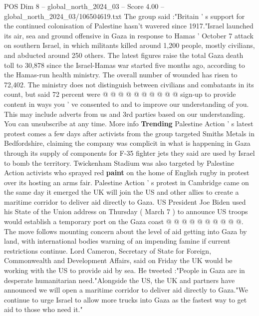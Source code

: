 \begin{textsample}{POS Dim 8 – global\_north\_2024\_03 – Score 4.00 – global\_north\_2024\_03/106504619.txt}
The group said :"Britain ' s support for the continued colonisation of Palestine hasn't wavered since 1917."Israel launched its air, sea and ground offensive in Gaza in response to Hamas ' October 7 attack on southern Israel, in which militants killed around 1,200 people, mostly civilians, and abducted around 250 others.
The latest figures raise the total Gaza death toll to 30,878 since the Israel-Hamas war started five months ago, according to the Hamas-run health ministry.
The overall number of wounded has risen to 72,402.
The ministry does not distinguish between civilians and combatants in its count, but said 72 percent were @ @ @ @ @ @ @ @ @ @ sign-up to provide content in ways you ' ve consented to and to improve our understanding of you.
This may include adverts from us and 3rd parties based on our understanding.
You can unsubscribe at any time.
More info \textbf{Trending} Palestine Action ' s latest protest comes a few days after activists from the group targeted Smiths Metals in Bedfordshire, claiming the company was complicit in what is happening in Gaza through its supply of components for F-35 fighter jets they said are used by Israel to bomb the territory.
Twickenham Stadium was also targeted by Palestine Action activists who sprayed red \textbf{paint} on the home of English rugby in protest over its hosting an arms fair.
Palestine Action ' s protest in Cambridge came on the same day it emerged the UK will join the US and other allies to create a maritime corridor to deliver aid directly to Gaza.
US President Joe Biden used his State of the Union address on Thursday ( March 7 ) to announce US troops would establish a temporary port on the Gaza coast @ @ @ @ @ @ @ @ @ @.
The move follows mounting concern about the level of aid getting into Gaza by land, with international bodies warning of an impending famine if current restrictions continue.
Lord Cameron, Secretary of State for Foreign, Commonwealth and Development Affairs, said on Friday the UK would be working with the US to provide aid by sea.
He tweeted :"People in Gaza are in desperate humanitarian need."Alongside the US, the UK and partners have announced we will open a maritime corridor to deliver aid directly to Gaza."We continue to urge Israel to allow more trucks into Gaza as the fastest way to get aid to those who need it."

\end{textsample}
